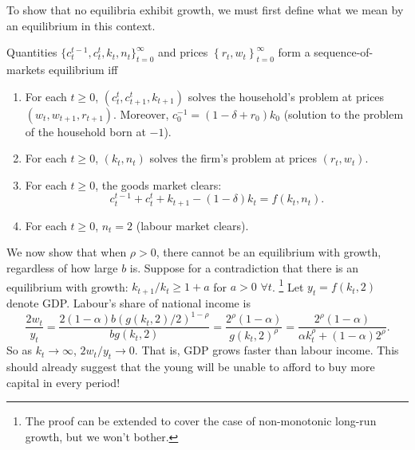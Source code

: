 \documentclass[11pt,letterpaper,reqno,oneside]{article}
\begin{document}
To show that no equilibria exhibit growth, we must first define what we mean by an equilibrium in this context.
%
\begin{definition}
	Quantities $\bigl\{ c^{t-1}_t, c^t_t, k_t, n_t \bigr\}_{t=0}^\infty$ and prices $\left\{ r_t, w_t \right\}_{t=0}^\infty$ form a sequence-of-markets equilibrium iff
	\begin{enumerate}
		
		\item For each $t \geq 0$, $(c^t_t,c^t_{t+1},k_{t+1})$ solves the household's problem at prices $(w_t,w_{t+1},r_{t+1})$. Moreover, $c^{-1}_0 = (1-\delta+r_0) k_0$ (solution to the problem of the household born at $-1$).

		\item For each $t \geq 0$, $(k_t,n_t)$ solves the firm's problem at prices $(r_t,w_t)$.

		\item For each $t \geq 0$, the goods market clears:
		\begin{equation*}
			c^{t-1}_t + c^t_t + k_{t+1} - (1-\delta) k_t = f(k_t,n_t) .
		\end{equation*}

		\item For each $t \geq 0$, $n_t = 2$ (labour market clears).

	\end{enumerate}
\end{definition}


We now show that when $\rho>0$, there cannot be an equilibrium with growth, regardless of how large $b$ is. Suppose for a contradiction that there is an equilibrium with growth: $k_{t+1}/k_t \geq 1 + a$ for $a>0$ $\forall t$.%
	\footnote{The proof can be extended to cover the case of non-monotonic long-run growth, but we won't bother.}
Let $y_t = f(k_t,2)$ denote GDP. Labour's share of national income is
%
\begin{equation*}
	\frac{2w_t}{y_t}
	=\frac{ 2 (1-\alpha) b (g(k_t,2)/2)^{1-\rho} }{ b g(k_t,2) }
	=\frac{ 2^\rho (1-\alpha) }{ g(k_t,2)^\rho }
	=\frac{ 2^\rho (1-\alpha) }
	{ \alpha k_t^\rho + (1-\alpha) 2^\rho } .
\end{equation*} 
%
So as $k_t \to \infty$, $2w_t/y_t \to 0$. That is, GDP grows faster than labour income. This should already suggest that the young will be unable to afford to buy more capital in every period!
\end{document}
